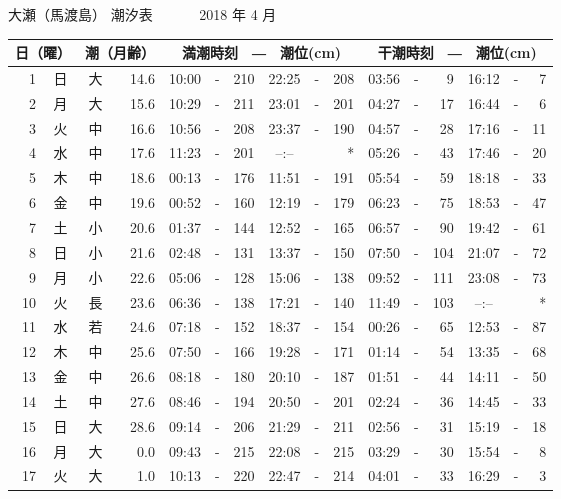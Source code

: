 \documentclass[12pt.a4j]{jsarticle}
\begin{document}
\begin{center}
\begin{table}[ht]
\end{table}
\newpage
{\LARGE 大瀬（馬渡島）  潮汐表　　　}
{\large 2018 年  4 月}\\
\begin{table}[ht]
\begin{tabular}{|rc|cr|ccrccr|ccrccr|}
\hline
\multicolumn{2}{|c|}{日（曜）} & \multicolumn{2}{c|}{潮（月齢）} & \multicolumn{6}{c|}{満潮時刻　―　潮位(cm)} & \multicolumn{6}{c|}{干潮時刻　―　潮位(cm)} \\
\hline
 1 & 日 & 大 & 14.6 & 10:00 &-& 210 & 22:25 &-& 208 & 03:56 &-&   9 & 16:12 &-&   7 \\
 2 & 月 & 大 & 15.6 & 10:29 &-& 211 & 23:01 &-& 201 & 04:27 &-&  17 & 16:44 &-&   6 \\
 3 & 火 & 中 & 16.6 & 10:56 &-& 208 & 23:37 &-& 190 & 04:57 &-&  28 & 17:16 &-&  11 \\
 4 & 水 & 中 & 17.6 & 11:23 &-& 201 & --:-- & &  *  & 05:26 &-&  43 & 17:46 &-&  20 \\
 5 & 木 & 中 & 18.6 & 00:13 &-& 176 & 11:51 &-& 191 & 05:54 &-&  59 & 18:18 &-&  33 \\
 6 & 金 & 中 & 19.6 & 00:52 &-& 160 & 12:19 &-& 179 & 06:23 &-&  75 & 18:53 &-&  47 \\
 7 & 土 & 小 & 20.6 & 01:37 &-& 144 & 12:52 &-& 165 & 06:57 &-&  90 & 19:42 &-&  61 \\
 8 & 日 & 小 & 21.6 & 02:48 &-& 131 & 13:37 &-& 150 & 07:50 &-& 104 & 21:07 &-&  72 \\
 9 & 月 & 小 & 22.6 & 05:06 &-& 128 & 15:06 &-& 138 & 09:52 &-& 111 & 23:08 &-&  73 \\
10 & 火 & 長 & 23.6 & 06:36 &-& 138 & 17:21 &-& 140 & 11:49 &-& 103 & --:-- & &  *  \\
11 & 水 & 若 & 24.6 & 07:18 &-& 152 & 18:37 &-& 154 & 00:26 &-&  65 & 12:53 &-&  87 \\
12 & 木 & 中 & 25.6 & 07:50 &-& 166 & 19:28 &-& 171 & 01:14 &-&  54 & 13:35 &-&  68 \\
13 & 金 & 中 & 26.6 & 08:18 &-& 180 & 20:10 &-& 187 & 01:51 &-&  44 & 14:11 &-&  50 \\
14 & 土 & 中 & 27.6 & 08:46 &-& 194 & 20:50 &-& 201 & 02:24 &-&  36 & 14:45 &-&  33 \\
15 & 日 & 大 & 28.6 & 09:14 &-& 206 & 21:29 &-& 211 & 02:56 &-&  31 & 15:19 &-&  18 \\
16 & 月 & 大 &  0.0 & 09:43 &-& 215 & 22:08 &-& 215 & 03:29 &-&  30 & 15:54 &-&   8 \\
17 & 火 & 大 &  1.0 & 10:13 &-& 220 & 22:47 &-& 214 & 04:01 &-&  33 & 16:29 &-&   3 \\

\end{tabular}
\end{table}
\end{center}
\end{document}

